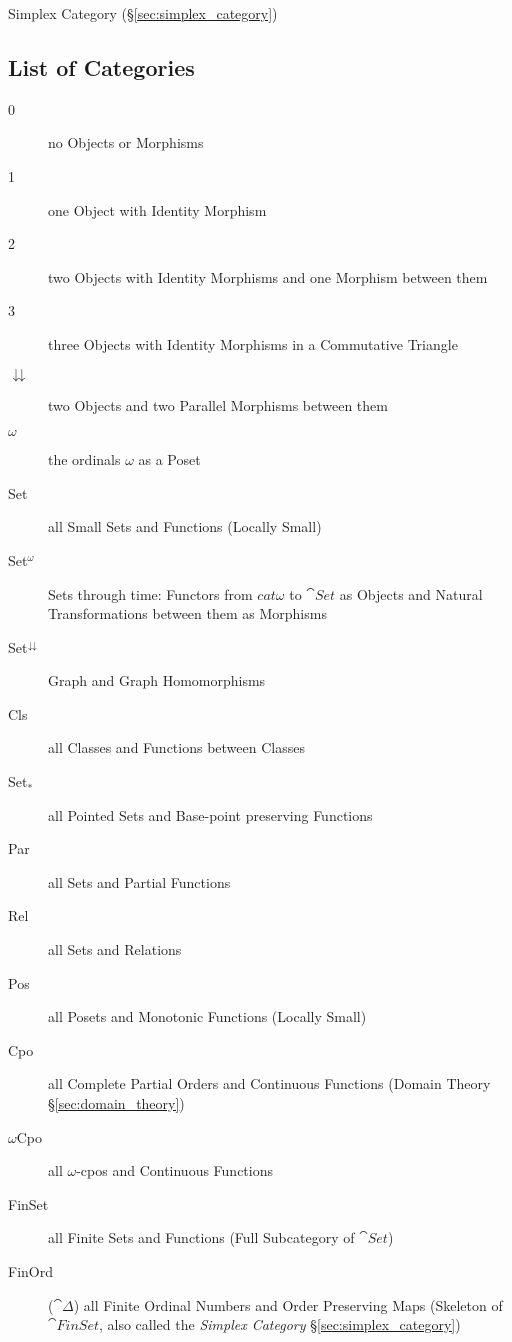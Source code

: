 Simplex Category (\S\ref{sec:simplex_category})



\subsection{List of Categories}\label{sec:categories_list}

\begin{description}
\item [0] no Objects or Morphisms
\item [1] one Object with Identity Morphism
\item [2] two Objects with Identity Morphisms and one Morphism between
  them
\item [3] three Objects with Identity Morphisms in a Commutative
  Triangle
\item [$\downdownarrows$] two Objects and two Parallel Morphisms
  between them
\item [$\omega$] the ordinals $\omega$ as a Poset
\item [Set] all Small Sets and Functions (Locally Small)
\item [Set$^\omega$] Sets through time: Functors from $cat{\omega}$
  to $\cat{Set}$ as Objects and Natural Transformations between
  them as Morphisms
\item [Set$^\downdownarrows$] Graph and Graph Homomorphisms
\item [Cls] all Classes and Functions between Classes
\item [Set$_*$] all Pointed Sets and Base-point preserving Functions
\item [Par] all Sets and Partial Functions
\item [Rel] all Sets and Relations
\item [Pos] all Posets and Monotonic Functions (Locally Small)
\item [Cpo] all Complete Partial Orders and Continuous Functions
  (Domain Theory \S\ref{sec:domain_theory})
\item [$\omega$Cpo] all $\omega$-cpos and Continuous Functions
\item [FinSet] all Finite Sets and Functions (Full Subcategory of
  $\cat{Set}$)
\item [FinOrd] ($\cat{\Delta}$) all Finite Ordinal Numbers and
  Order Preserving Maps (Skeleton of $\cat{FinSet}$, also called
  the \emph{Simplex Category} \S\ref{sec:simplex_category})

\end{description}
